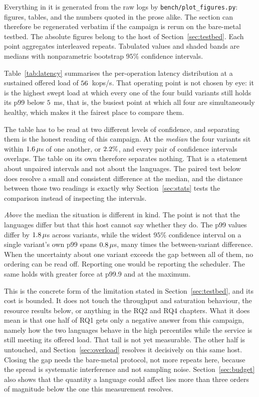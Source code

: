 \documentclass[english,oneside,a4paper,censored,csm,software-track-2020]{HYthesisML}
\begin{document}
Everything in it is generated from the raw logs by \texttt{bench/plot\_figures.py}: figures,
tables, and the numbers quoted in the prose alike. The section can therefore be regenerated
verbatim if the campaign is rerun on the bare-metal testbed. The absolute figures belong to the
host of Section~\ref{sec:testbed}. Each point aggregates \NRepeats{} interleaved repeats.
Tabulated values and shaded bands are medians with nonparametric bootstrap $95\%$ confidence
intervals.

Table~\ref{tab:latency} summarises the per-operation latency distribution at a sustained
offered load of $56$~kops/s. That operating point is not chosen by eye: it is the
highest swept load at which every one of the four build variants still holds its p99 below
$5$~ms, that is, the busiest point at which all four are simultaneously healthy, which makes
it the fairest place to compare them.

The table has to be read at two different levels of confidence, and separating them is the
honest reading of this campaign. At the \emph{median} the four variants sit within
$1.6\,\mu$s of one another, or $2.2\%$, and every pair of confidence
intervals overlaps. The table on its own therefore separates nothing.
That is a statement about unpaired intervals and not about the languages. The paired test
below does resolve a small and consistent difference at the median, and the distance between
those two readings is exactly why Section~\ref{sec:stats} tests the comparison instead of
inspecting the intervals.

\emph{Above} the median the situation is different in kind. The point is not that the languages
differ but that this host cannot say whether they do. The p99 values differ by
$1.8\,\mu$s across variants, while the widest $95\%$ confidence interval on a
single variant's own p99 spans $0.8\,\mu$s, many times the between-variant
difference. When the uncertainty about one variant exceeds the gap between all of them, no
ordering can be read off. Reporting one would be reporting the scheduler. The same holds
with greater force at p99.9 and at the maximum.

This is the concrete form of the limitation stated in Section~\ref{sec:testbed}, and its cost is
bounded. It does not touch the throughput and saturation behaviour, the resource results below,
or anything in the RQ2 and RQ4 chapters. What it does mean is that one half of RQ1 gets only a
negative answer from this campaign, namely how the two languages behave in the high percentiles
while the service is still meeting its offered load. That tail is not yet measurable. The other
half is untouched, and Section~\ref{sec:overload} resolves it decisively on this same host.
Closing the gap needs the bare-metal protocol, not more repeats here, because the spread is
systematic interference and not sampling noise. Section~\ref{sec:budget} also shows that the
quantity a language could affect lies more than three orders of magnitude below the one this
measurement resolves.
\end{document}
